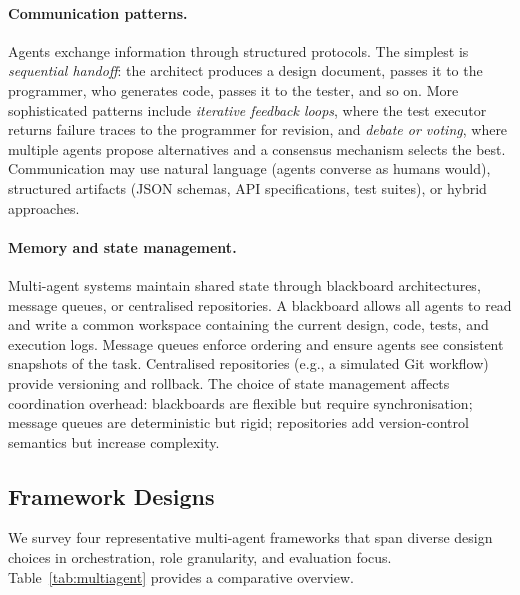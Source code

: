 \paragraph{Communication patterns.}
Agents exchange information through structured protocols. The simplest is
\emph{sequential handoff}: the architect produces a design document, passes it
to the programmer, who generates code, passes it to the tester, and so on. More
sophisticated patterns include \emph{iterative feedback loops}, where the test
executor returns failure traces to the programmer for revision, and
\emph{debate or voting}, where multiple agents propose alternatives and a
consensus mechanism selects the best. Communication may use natural language
(agents converse as humans would), structured artifacts (JSON schemas, API
specifications, test suites), or hybrid approaches.

\paragraph{Memory and state management.}
Multi-agent systems maintain shared state through blackboard architectures,
message queues, or centralised repositories. A blackboard allows all agents to
read and write a common workspace containing the current design, code, tests,
and execution logs. Message queues enforce ordering and ensure agents see
consistent snapshots of the task. Centralised repositories (e.g., a simulated
Git workflow) provide versioning and rollback. The choice of state management
affects coordination overhead: blackboards are flexible but require
synchronisation; message queues are deterministic but rigid; repositories add
version-control semantics but increase complexity.

\subsection{Framework Designs}
\label{sec:multi-frameworks}

We survey four representative multi-agent frameworks that span diverse design
choices in orchestration, role granularity, and evaluation focus.
Table~\ref{tab:multiagent} provides a comparative overview.

